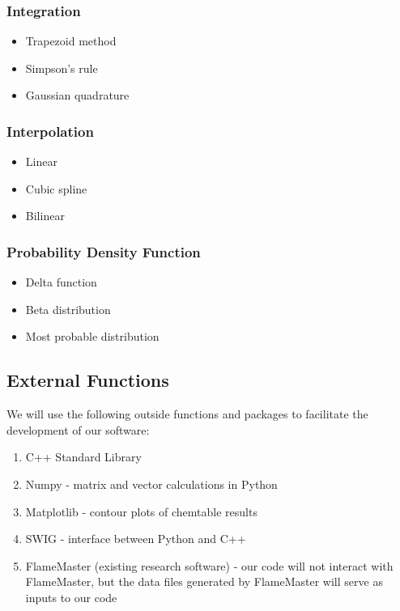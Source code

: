 \documentclass[11pt]{article}
\begin{document}
\subsubsection{Integration}
\begin{itemize}
\item Trapezoid method
\item Simpson’s rule
\item Gaussian quadrature
\end{itemize}

\subsubsection{Interpolation}
\begin{itemize}
\item Linear
\item Cubic spline
\item Bilinear
\end{itemize}

\subsubsection{Probability Density Function}
\begin{itemize}
\item Delta function
\item Beta distribution
\item Most probable distribution
\end{itemize}

\subsection{External Functions}

We will use the following outside functions and packages to facilitate the development of our software:
\begin{enumerate}
\item C++ Standard Library
\item Numpy - matrix and vector calculations in Python
\item Matplotlib - contour plots of chemtable results
\item SWIG - interface between Python and C++
\item FlameMaster (existing research software) - our code will not interact with FlameMaster, but the data files generated by FlameMaster will serve as inputs to our code
\end{enumerate}
\end{document}
